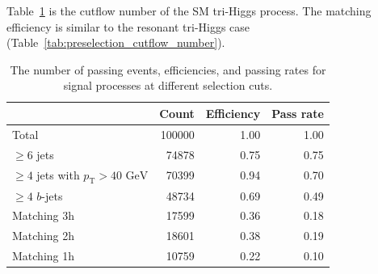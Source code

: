 \documentclass[12pt]{article}
\begin{document}
	Table~\ref{tab:preselection_cutflow_number_sm} is the cutflow number of the SM tri-Higgs process. The matching efficiency is similar to the resonant tri-Higgs case (Table~\ref{tab:preselection_cutflow_number}).
    \begin{table}[htpb]
        \centering
        \caption{The number of passing events, efficiencies, and passing rates for signal processes at different selection cuts.}
        \label{tab:preselection_cutflow_number_sm}
        \begin{tabular}{l|rrr}
                                                         & Count  & Efficiency & Pass rate \\ \hline
        Total                                            & 100000 & 1.00       & 1.00      \\
        $\ge 6$ jets                                     & 74878  & 0.75       & 0.75      \\
        $\ge 4$ jets with $p_{\text{T}} > \text{40 GeV}$ & 70399  & 0.94       & 0.70      \\
        $\ge 4$ $b$-jets                                 & 48734  & 0.69       & 0.49      \\ \hline
        Matching 3h                                      & 17599  & 0.36       & 0.18      \\
        Matching 2h                                      & 18601  & 0.38       & 0.19      \\
        Matching 1h                                      & 10759  & 0.22       & 0.10      \\
        \end{tabular}
    \end{table}
\end{document}
